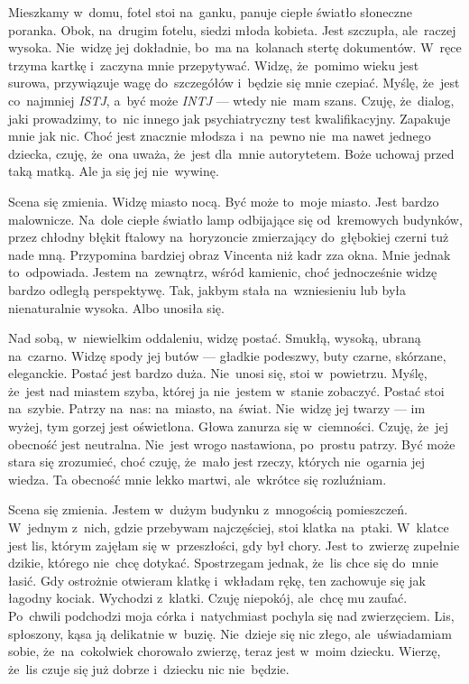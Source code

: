 \documentclass[9pt, a5paper]{memoir}
\begin{document}
Mieszkamy w~domu, fotel stoi na~ganku, panuje ciepłe światło słoneczne poranka. Obok, na~drugim fotelu, siedzi młoda kobieta. Jest szczupła, ale~raczej wysoka. Nie~widzę jej dokładnie, bo~ma na~kolanach stertę dokumentów. W~ręce trzyma kartkę i~zaczyna mnie przepytywać. Widzę, że~pomimo wieku jest surowa, przywiązuje wagę do~szczegółów i~będzie się mnie czepiać. Myślę, że~jest co~najmniej \textit{ISTJ}, a~być może \textit{INTJ} --- wtedy nie~mam szans. Czuję, że~dialog, jaki prowadzimy, to~nic innego jak psychiatryczny test kwalifikacyjny. Zapakuje mnie jak nic. Choć jest znacznie młodsza i~na~pewno nie~ma nawet jednego dziecka, czuję, że~ona uważa, że~jest dla~mnie autorytetem. Boże uchowaj przed taką matką. Ale ja się jej nie~wywinę.

Scena się zmienia. Widzę miasto nocą. Być może to~moje miasto. Jest bardzo malownicze. Na~dole ciepłe światło lamp odbijające się od~kremowych budynków, przez chłodny błękit ftalowy na~horyzoncie zmierzający do~głębokiej czerni tuż nade mną. Przypomina bardziej obraz Vincenta niż kadr zza okna. Mnie jednak to~odpowiada. Jestem na~zewnątrz, wśród kamienic, choć jednocześnie widzę bardzo odległą perspektywę. Tak, jakbym stała na~wzniesieniu lub była nienaturalnie wysoka. Albo unosiła się.

Nad sobą, w~niewielkim oddaleniu, widzę postać. Smukłą, wysoką, ubraną na~czarno. Widzę spody jej butów --- gładkie podeszwy, buty czarne, skórzane, eleganckie. Postać jest bardzo duża. Nie~unosi się, stoi w~powietrzu. Myślę, że~jest nad miastem szyba, której ja nie~jestem w~stanie zobaczyć. Postać stoi na~szybie. Patrzy na~nas: na~miasto, na~świat. Nie~widzę jej twarzy --- im wyżej, tym gorzej jest oświetlona. Głowa zanurza się w~ciemności. Czuję, że~jej obecność jest neutralna. Nie~jest wrogo nastawiona, po~prostu patrzy. Być może stara się zrozumieć, choć czuję, że~mało jest rzeczy, których nie~ogarnia jej wiedza. Ta obecność mnie lekko martwi, ale~wkrótce się rozluźniam.

Scena się zmienia. Jestem w~dużym budynku z~mnogością pomieszczeń. W~jednym z~nich, gdzie przebywam najczęściej, stoi klatka na~ptaki. W~klatce jest lis, którym zajęłam się w~przeszłości, gdy był chory. Jest to~zwierzę zupełnie dzikie, którego nie~chcę dotykać. Spostrzegam jednak, że~lis chce się do~mnie łasić. Gdy ostrożnie otwieram klatkę i~wkładam rękę, ten zachowuje się jak łagodny kociak. Wychodzi z~klatki. Czuję niepokój, ale~chcę mu zaufać. Po~chwili podchodzi moja córka i~natychmiast pochyla się nad zwierzęciem. Lis, spłoszony, kąsa ją delikatnie w~buzię. Nie~dzieje się nic złego, ale~uświadamiam sobie, że~na~cokolwiek chorowało zwierzę, teraz jest w~moim dziecku. Wierzę, że~lis czuje się już dobrze i~dziecku nic nie~będzie.
\end{document}
